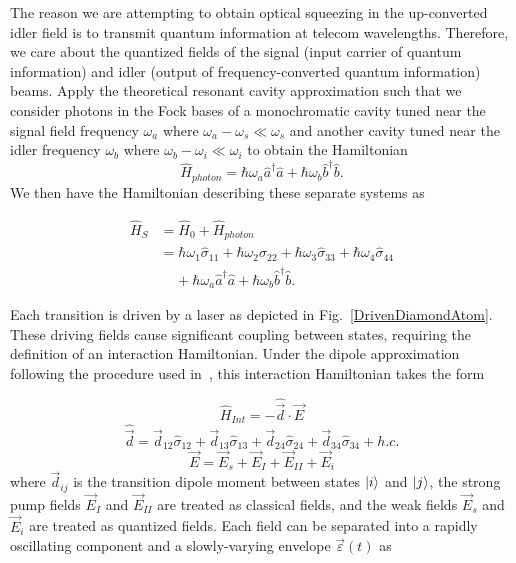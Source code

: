 \documentclass[aps,pra,showpacs,amsmath,amssymb,nofootinbib,longbibliography,superscriptaddress
]{revtex4-1}
\DeclarePairedDelimiter\ket{\lvert}{\rangle}
\theoremstyle{definition}
\theoremstyle{remark}
\newcommand{\0}{\hat{0}}
\begin{document}
The reason we are attempting to obtain optical squeezing in the up-converted idler field is to transmit quantum information at telecom wavelengths. Therefore, we care about the quantized fields of the signal (input carrier of quantum information) and idler (output of frequency-converted quantum information) beams. Apply the theoretical resonant cavity approximation such that we consider photons in the Fock bases of a monochromatic cavity tuned near the signal field frequency $\omega_a$ where $\omega_a - \omega_s \ll \omega_s$ and another cavity tuned near the idler frequency $\omega_b$ where $\omega_b - \omega_i \ll \omega_i$ to obtain the Hamiltonian
\begin{equation}
    \hat{H}_{photon} = \hbar \omega_{a} \hat{a}^{\dagger} \hat{a} + \hbar \omega_{b} \hat{b}^{\dagger} \hat{b}.
\end{equation}
We then have the Hamiltonian describing these separate systems as


\begin{align}
    \hat{H}_S &= \hat{H}_0 + \hat{H}_{photon}\nonumber\\
    &= \hbar \omega_1 \hat{\sigma}_{11} + \hbar \omega_2 \hat{\sigma}_{22} + \hbar \omega_3 \hat{\sigma}_{33} + \hbar \omega_4 \hat{\sigma}_{44}\nonumber \\
    &\;\;\;\;+ \hbar \omega_{a} \hat{a}^{\dagger} \hat{a} + \hbar \omega_{b} \hat{b}^{\dagger} \hat{b}.
\end{align}


Each transition is driven by a laser as depicted in Fig.~\ref{DrivenDiamondAtom}. These driving fields cause significant coupling between states, requiring the definition of an interaction Hamiltonian. Under the dipole approximation following the procedure used in~\cite{QuantumInternet}, this interaction Hamiltonian takes the form


\begin{equation}
    \hat{H}_{Int} = - \hat{\vec{d}} \cdot \vec{E}
\end{equation}
\begin{equation}
    \hat{\vec{d}} = \vec{d}_{12} \hat{\sigma}_{12} + \vec{d}_{13} \hat{\sigma}_{13} + \vec{d}_{24} \hat{\sigma}_{24} + \vec{d}_{34} \hat{\sigma}_{34} + h.c.
\end{equation}
\begin{equation}
    \vec{E} = \vec{E}_{s} + \vec{E}_{I} + \vec{E}_{II} + \vec{E}_{i}
\end{equation}
where $\vec{d}_{ij}$ is the transition dipole moment between states $\ket{i}$ and $\ket{j}$, the strong pump fields $\vec{E}_I$ and $\vec{E}_{II}$ are treated as classical fields, and the weak fields $\vec{E}_{s}$ and $\vec{E}_{i}$ are treated as quantized fields. Each field can be separated into a rapidly oscillating component and a slowly-varying envelope $\vec{\varepsilon}(t)$ as
\end{document}
